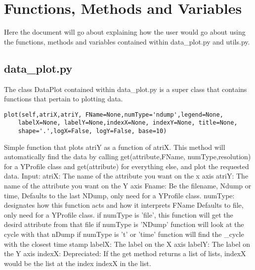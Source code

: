 \section{Functions, Methods and Variables}
Here the document will go about explaining how the user would go about using the functions, methods and variables
contained within data\_plot.py and utils.py.

\subsection{data\_plot.py}
The class DataPlot contained within data\_plot.py is a super class that contains functions that pertain to plotting data.
\newline
\begin{verbatim}
plot(self,atriX,atriY, FName=None,numType='ndump',legend=None,
    labelX=None, labelY=None,indexX=None, indexY=None, title=None, 
    shape='.',logX=False, logY=False, base=10)
\end{verbatim}	
Simple function that plots atriY as a function of atriX. This method will automatically find the data by calling
get(attribute,FName, numType,resolution) for a YProfile class and get(attribute) for everything else, and plot the requested data.\newline
		Input:\newline
		atriX: The name of the attribute you want on the x axis \newline
		atriY: The name of the attribute you want on the Y axis \newline
		Fname: Be the filename, Ndump or time, Defaults to the last 
			NDump, only need for a YProfile class.\newline
		numType: designates how this function acts and how it interprets 
			FName Defaults to file, only need for a YProfile class.\newline
		if numType is 'file', this function will get the desird attribute from that file\newline
		if numType is 'NDump' function will look at the cycle with that nDump\newline
		if numType is 't' or 'time' function will find the \_cycle with the closest time stamp \newline
		labelX: The label on the X axis \newline
		labelY: The label on the Y axis \newline
		indexX: Depreciated: If the get method returns a list of lists, indexX
			would be the list at the index indexX in the list.\newline

